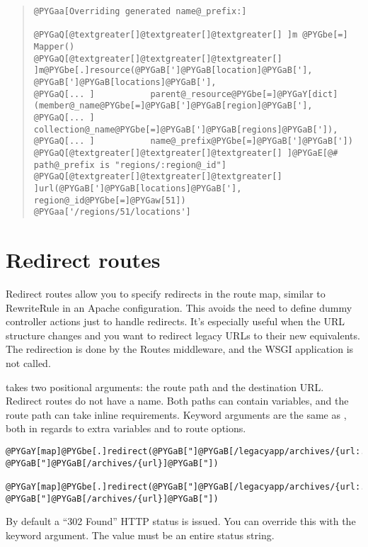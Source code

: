 \documentclass[letterpaper,10pt,english]{manual}
\begin{document}
\begin{quote}
\begin{Verbatim}[commandchars=@\[\]]
@PYGaa[Overriding generated name@_prefix:]

@PYGaQ[@textgreater[]@textgreater[]@textgreater[] ]m @PYGbe[=] Mapper()
@PYGaQ[@textgreater[]@textgreater[]@textgreater[] ]m@PYGbe[.]resource(@PYGaB[']@PYGaB[location]@PYGaB['], @PYGaB[']@PYGaB[locations]@PYGaB['],
@PYGaQ[... ]           parent@_resource@PYGbe[=]@PYGaY[dict](member@_name@PYGbe[=]@PYGaB[']@PYGaB[region]@PYGaB['],
@PYGaQ[... ]                                collection@_name@PYGbe[=]@PYGaB[']@PYGaB[regions]@PYGaB[']),
@PYGaQ[... ]           name@_prefix@PYGbe[=]@PYGaB[']@PYGaB['])
@PYGaQ[@textgreater[]@textgreater[]@textgreater[] ]@PYGaE[@# path@_prefix is "regions/:region@_id"]
@PYGaQ[@textgreater[]@textgreater[]@textgreater[] ]url(@PYGaB[']@PYGaB[locations]@PYGaB['], region@_id@PYGbe[=]@PYGaw[51])
@PYGaa['/regions/51/locations']
\end{Verbatim}
\end{quote}


\section{Redirect routes}

Redirect routes allow you to specify redirects in the route map, similar to
RewriteRule in an Apache configuration.  This avoids the need to define dummy
controller actions just to handle redirects.  It's especially useful when the
URL structure changes and you want to redirect legacy URLs to their new
equivalents.  The redirection is done by the Routes middleware, and the WSGI
application is not called.

 takes two positional arguments:  the route path and the
destination URL.  Redirect routes do not have a name.  Both paths can contain
variables, and the route path can take inline requirements.  Keyword arguments
are the same as , both in regards to extra variables and to route
options.

\begin{Verbatim}[commandchars=@\[\]]
@PYGaY[map]@PYGbe[.]redirect(@PYGaB["]@PYGaB[/legacyapp/archives/{url:.*}]@PYGaB["], @PYGaB["]@PYGaB[/archives/{url}]@PYGaB["])

@PYGaY[map]@PYGbe[.]redirect(@PYGaB["]@PYGaB[/legacyapp/archives/{url:.*}]@PYGaB["], @PYGaB["]@PYGaB[/archives/{url}]@PYGaB["])
\end{Verbatim}

By default a ``302 Found'' HTTP status is issued.  You can override this with the
 keyword argument.  The value must be an entire status
string.
\end{document}
